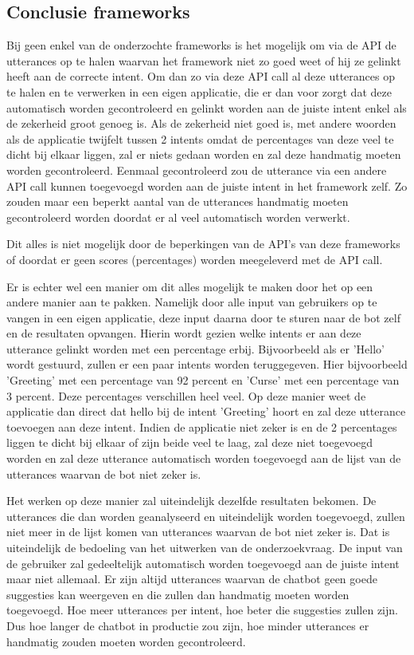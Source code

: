 \subsection{Conclusie frameworks}
\label{conclusieFrameworks}

Bij geen enkel van de onderzochte frameworks is het mogelijk om via de API de utterances op te halen waarvan het framework niet zo goed weet of hij ze gelinkt heeft aan de correcte intent. Om dan zo via deze API call al deze utterances op te halen en te verwerken in een eigen applicatie, die er dan voor zorgt dat deze automatisch worden gecontroleerd en gelinkt worden aan de juiste intent enkel als de zekerheid groot genoeg is. Als de zekerheid niet goed is, met andere woorden als de applicatie twijfelt tussen 2 intents omdat de percentages van deze veel te dicht bij elkaar liggen, zal er niets gedaan worden en zal deze handmatig moeten worden gecontroleerd. Eenmaal gecontroleerd zou de utterance via een andere API call kunnen toegevoegd worden aan de juiste intent in het framework zelf. Zo zouden maar een beperkt aantal van de utterances handmatig moeten gecontroleerd worden doordat er al veel automatisch worden verwerkt.

Dit alles is niet mogelijk door de beperkingen van de API's van deze frameworks of doordat er geen scores (percentages) worden meegeleverd met de API call.

Er is echter wel een manier om dit alles mogelijk te maken door het op een andere manier aan te pakken. Namelijk door alle input van gebruikers op te vangen in een eigen applicatie, deze input daarna door te sturen naar de bot zelf en de resultaten opvangen. Hierin wordt gezien welke intents er aan deze utterance gelinkt worden met een percentage erbij. Bijvoorbeeld als er 'Hello' wordt gestuurd, zullen er een paar intents worden teruggegeven. Hier bijvoorbeeld 'Greeting' met een percentage van 92 percent en 'Curse' met een percentage van 3 percent. Deze percentages verschillen heel veel. Op deze manier weet de applicatie dan direct dat hello bij de intent 'Greeting' hoort en zal deze utterance toevoegen aan deze intent. Indien de applicatie niet zeker is en de 2 percentages liggen te dicht bij elkaar of zijn beide veel te laag, zal deze niet toegevoegd worden en zal deze utterance automatisch worden toegevoegd aan de lijst van de utterances waarvan de bot niet zeker is.

Het werken op deze manier zal uiteindelijk dezelfde resultaten bekomen. De utterances die dan worden geanalyseerd en uiteindelijk worden toegevoegd, zullen niet meer in de lijst komen van utterances waarvan de bot niet zeker is. Dat is uiteindelijk de bedoeling van het uitwerken van de onderzoekvraag. De input van de gebruiker zal gedeeltelijk automatisch worden toegevoegd aan de juiste intent maar niet allemaal. Er zijn altijd utterances waarvan de chatbot geen goede suggesties kan weergeven en die zullen dan handmatig moeten worden toegevoegd. Hoe meer utterances per intent, hoe beter die suggesties zullen zijn. Dus hoe langer de chatbot in productie zou zijn, hoe minder utterances er handmatig zouden moeten worden gecontroleerd.

